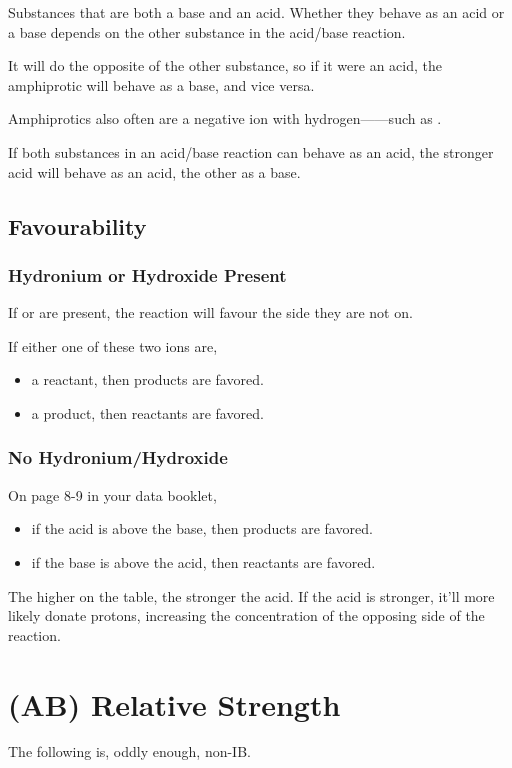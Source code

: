 \documentclass[a4paper,12pt]{article}
\begin{document}
Substances that are both a base and an acid. Whether they behave as an acid or a base depends on the other substance in the acid/base reaction. 

It will do the opposite of the other substance, so if it were an acid, the amphiprotic will behave as a base, and vice versa.

Amphiprotics also often are a negative ion with hydrogen------such as .

If both substances in an acid/base reaction can behave as an acid, the stronger acid will behave as an acid, the other as a base.

\subsection{Favourability}
\subsubsection{Hydronium or Hydroxide Present}
If  or  are present, the reaction will favour the side they are not on.

If either one of these two ions are,
\begin{itemize}
    \item{a reactant, then products are favored. \ce{->[$>99.9\%$]}}
    \item{a product, then reactants are favored. \ce{<=>[$<50\%$]}}
\end{itemize}

\subsubsection{No Hydronium/Hydroxide}
On page 8-9 in your data booklet,
\begin{itemize}
    \item{if the acid is above the base, then products are favored. \ce{->[$>99.9\%$]}}
    \item{if the base is above the acid, then reactants are favored. \ce{<=>[$<50\%$]}}
\end{itemize}

The higher on the table, the stronger the acid. If the acid is stronger, it'll more likely donate protons, increasing the concentration of the opposing side of the reaction.

\section{(AB) Relative Strength}
The following is, oddly enough, non-IB.
\end{document}
